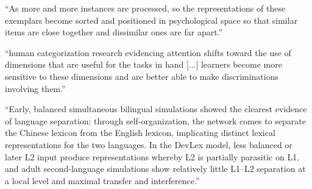 
``As more and more instances are processed,
so the representations of these exemplars become sorted and positioned in
psychological space so that similar items are close together and dissimilar
ones are far apart.''

``human categorization
research evidencing attention shifts toward the use of dimensions that are
useful for the tasks in hand [...] learners
become more sensitive to these dimensions and are better able to make
discriminations involving them.''

``Early, balanced simultaneous bilingual
simulations showed the clearest evidence of language separation: through
self-organization, the network comes to separate the Chinese lexicon from
the English lexicon, implicating distinct lexical representations for the
two languages. In the DevLex model, less balanced or later L2 input
produce representations whereby L2 is partially parasitic on L1, and adult
second-language simulations show relatively little L1–L2 separation at a local
level and maximal transfer and interference.''


